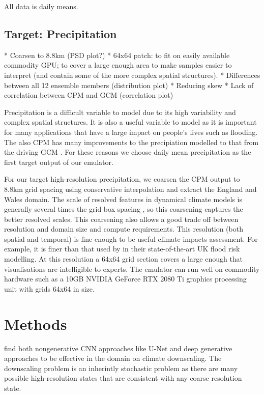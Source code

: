 All data is daily means.

\subsection{Target: Precipitation}

* Coarsen to 8.8km (PSD plot?)
* 64x64 patch: to fit on easily available commodity GPU; to cover a large enough area to make samples easier to interpret (and contain some of the more complex spatial structures).
* Differences between all 12 ensemble members (distribution plot)
* Reducing skew
* Lack of correlation between CPM and GCM (correlation plot)

Precipitation is a difficult variable to model due to its high variability and complex spatial structures.
It is also a useful variable to model as it is important for many applications that have a large impact on people's lives such as flooding.
The also CPM has many improvements to the precipiation modelled to that from the driving GCM \parencite{kendon2012vhrrcmprecip, kendon2014heaviersummerrain, kendon2020futureCPMwinterprecip}.
For these reasons we choose daily mean precipitation as the first target output of our emulator.

For our target high-resolution precipitation, we coarsen the CPM output to 8.8km grid spacing using conservative interpolation and extract the England and Wales domain. The scale of resolved features in dynamical climate models is generally several times the grid box spacing \parencite{klaver2020effectiveresolution}, so this coarsening captures the better resolved scales. This coarsening also allows a good trade off between resolution and domain size and compute requirements.
This resolution (both spatial and temporal) is fine enough to be useful climate impacts assessment. For example, it is finer than that used by \textcite{bates2023ukfloodingrisk} in their state-of-the-art UK flood risk modelling.
At this resolution a 64x64 grid section covers a large enough that visualisations are intelligible to experts.
The emulator can run well on commodity hardware such as a 10GB NVIDIA GeForce RTX 2080 Ti graphics processing unit with grids 64x64 in size.

\section{Methods}

\textcite{rampal2024mlclimdownscalingreview} find both nongenerative CNN approaches like U-Net \parencite{ronnenberger2015unet} and deep generative approaches to be effective in the domain on climate downscaling.
The downscaling problem is an inherintly stochastic problem as there are many possible high-resolution states that are consistent with any coarse resolution state.

